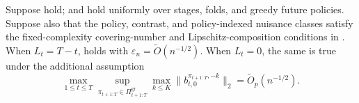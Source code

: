 \documentclass[opre,nonblindrev]{informs4}
\newcommand{\norm}[1]{\lVert#1\rVert}
\begin{document}
\begin{corollary}
\label{cor:uniform-endpoint-rootn}
Suppose 
hold; and  hold uniformly over
stages, folds, and greedy future policies. Suppose also that
the policy, contrast, and policy-indexed nuisance classes satisfy the
fixed-complexity covering-number and Lipschitz-composition conditions in
. When $L_t=T-t$,
 holds with $\varepsilon_n=\widetilde O(n^{-1/2}).$ When $L_t=0$, the same is true under the additional assumption
\[
\max_{1\leq t\leq T}
\sup_{\pi_{t+1:T}\in\Pi_{t+1:T}^{\mathrm{gr}}}
\max_{k\leq K}\norm{b_{t,0}^{\pi_{t+1:T},-k}}_2
=\widetilde O_p(n^{-1/2}).
\]
\end{corollary}
\end{document}
